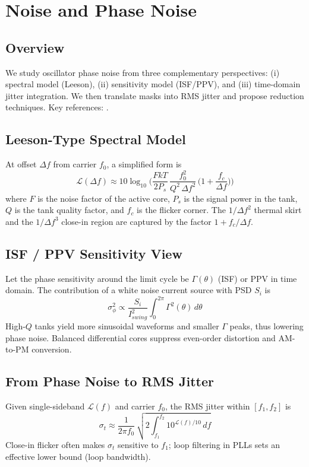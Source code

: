 \chapter{Noise and Phase Noise}
\section{Overview}
We study oscillator phase noise from three complementary perspectives: (i) spectral model (Leeson), (ii) sensitivity model (ISF/PPV), and (iii) time-domain jitter integration. We then translate masks into RMS jitter and propose reduction techniques. Key references: \cite{leeson1966,hajimiri1998,demir2000,razavi_rf}.

\section{Leeson-Type Spectral Model}
At offset \(\Delta f\) from carrier \(f_0\), a simplified form is
\[
 \mathcal{L}(\Delta f) \approx 10\log_{10}\!\Bigg( \frac{F k T}{2 P_s}\,\frac{f_0^2}{Q^2\,\Delta f^2}\,\Big(1+\frac{f_c}{\Delta f}\Big) \Bigg)
\]
where \(F\) is the noise factor of the active core, \(P_s\) is the signal power in the tank, \(Q\) is the tank quality factor, and \(f_c\) is the flicker corner. The \(1/\Delta f^2\) thermal skirt and the \(1/\Delta f^3\) close-in region are captured by the factor \(1+f_c/\Delta f\).

\section{ISF / PPV Sensitivity View}
Let the phase sensitivity around the limit cycle be \(\Gamma(\theta)\) (ISF) or PPV in time domain. The contribution of a white noise current source with PSD \(S_i\) is
\[
 \sigma_\phi^2 \propto \frac{S_i}{I_{swing}^2} \int_0^{2\pi} \Gamma^2(\theta)\, d\theta
\]
High-\(Q\) tanks yield more sinusoidal waveforms and smaller \(\Gamma\) peaks, thus lowering phase noise. Balanced differential cores suppress even-order distortion and AM-to-PM conversion.

\section{From Phase Noise to RMS Jitter}
Given single-sideband \(\mathcal{L}(f)\) and carrier \(f_0\), the RMS jitter within \([f_1,f_2]\) is
\[
 \sigma_t \approx \frac{1}{2\pi f_0}\,\sqrt{2\int_{f_1}^{f_2} 10^{\mathcal{L}(f)/10}\, df}
\]
Close-in flicker often makes \(\sigma_t\) sensitive to \(f_1\); loop filtering in PLLs sets an effective lower bound (loop bandwidth).

